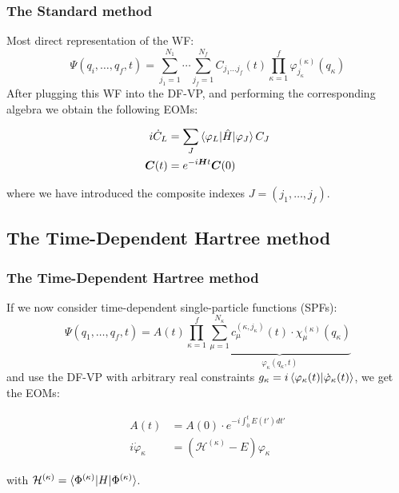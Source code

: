 \documentclass{beamer}
\begin{document}
\begin{frame}
  \frametitle{The Standard method}
  Most direct representation of the WF\@: 
\begin{equation}
	\Psi(q_i,\ldots, q_f, t) = \sum_{j_1=1}^{N_1}\cdots\sum_{j_f=1}^{N_f} C_{j_1\ldots j_f}(t)\prod_{\kappa=1}^f\varphi^{(\kappa)}_{j_{\kappa}}(q_{\kappa})
	\label{stme}
\end{equation}
After plugging this WF into the DF-VP, and performing the corresponding algebra we obtain
the following EOMs:
\begin{block}{}
\begin{align}
\begin{split}
	i\dot{C}_L &= \sum_J \braket{\varphi_L|\hat{H}|\varphi_J}C_J \\
	\bm{C}(t) &= e^{-i\bm{H}t}\bm{C}(0)
\end{split}
\end{align}
\end{block}
where we have introduced the composite indexes \(J = (j_1,\ldots,j_f)\).

\end{frame}

\subsection{The Time-Dependent Hartree method}\label{tdh}

\begin{frame}
  \frametitle{The Time-Dependent Hartree method}
  \justifying{}
  If we now consider time-dependent single-particle functions (SPFs):
\begin{equation}
  \Psi(q_1,\ldots, q_f, t) = A(t)\prod^f_{\kappa=1}\underbrace{
	\sum_{\mu=1}^{N_{\kappa}}c_{\mu}^{(\kappa, j_{\kappa})}(t)\cdot \chi^{(\kappa)}_{\mu}(q_{\kappa})}_{\varphi_{\kappa}(q_{\kappa}, t)}
\end{equation}
and use the DF-VP with arbitrary real constraints \(g_{\kappa} = i\braket{\varphi_{\kappa}(t)|\dot{\varphi}_{\kappa}(t)}\), we get the EOMs:

\begin{block}{}
  \begin{equation}
    \begin{split}
      A(t) &= A(0) \cdot e^{-i\int_0^t E(t')dt'} \\
      i\dot{\varphi}_{\kappa} &= (\mathcal{H}^{(\kappa)} - E)\varphi_{\kappa}
    \end{split}
  \end{equation}
\end{block}
with \(\mathcal{H}^{(\kappa)} = \braket{\Phi^{(\kappa)}|H|\Phi^{(\kappa)}}\).
\end{frame}
\end{document}
